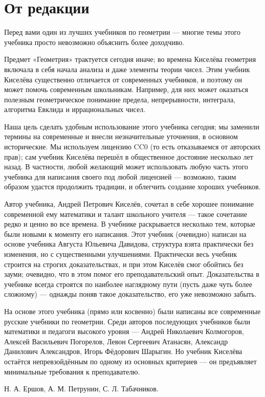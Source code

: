 \section*{От редакции}


Перед вами один из лучших учебников по геометрии —
многие темы этого учебника просто невозможно объяснить более доходчиво.

Предмет «Геометрия» трактуется сегодня иначе;
во времена Киселёва геометрия включала в себя начала анализа и даже элементы теории чисел.
Этим учебник Киселёва существенно отличается от современных учебников, и поэтому он может помочь современным школьникам.
Например, для них может оказаться полезным геометрическое понимание предела, непрерывности, интеграла, алгоритма Евклида и иррациональных чисел.

Наша цель сделать удобным использование этого учебника сегодня;
мы заменили термины на современные и внесли незначительные уточнения, в основном исторические. 
Мы используем лицензию CC0 (то есть отказываемся от авторских прав); сам учебник Киселёва перешёл в общественное достояние несколько лет назад.
В частности, любой желающий может использовать любую часть этого учебника для написания своего под любой лицензией —
возможно, таким образом удастся продолжить традиции, и облегчить создание хороших учебников. 

Автор учебника, Андрей Петрович Киселёв, сочетал в себе хорошее понимание современной ему математики и талант школьного учителя — такое сочетание редко и ценно во все времена.
В учебнике раскрывается несколько тем, которые были новыми к моменту его написания. 
Этот учебник (очевидно) написан на основе учебника Августа Юльевича Давидова, структура взята практически без изменения, но с существенными улучшениями.
Практически весь учебник строится на строгих доказательствах, и при этом Киселёв смог обойтись без зауми;
очевидно, что в этом помог его преподавательский опыт.
Доказательства в учебнике всегда строятся по наиболее наглядному пути (пусть даже чуть более сложному) — однажды поняв такое доказательство, его уже невозможно забыть. 

На основе этого учебника (прямо или косвенно) были написаны все современные русские учебники по геометрии.
Среди авторов последующих учебников были математики и педагоги высокого уровня — 
Андрей Николаевич Колмогоров, 
Алексей Васильевич Погорелов, 
Левон Сергеевич Атанасян, 
Александр Данилович Александров, 
Игорь Фёдорович Шарыгин.
Но учебник Киселёва остаётся непревзойдённым по одному из основных критериев —
он предъявляет минимальные требования к преподавателю.

\begin{flushright}
Н. А. Ершов,
А. М. Петрунин, 
С. Л. Табачников.        
\end{flushright}
\clearpage
